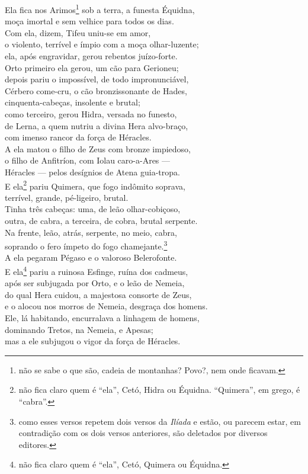 \quad{}Ela fica nos Arimos\footnote{não se sabe o que são, cadeia de montanhas? Povo?, nem onde ficavam.} sob a terra, a funesta Équidna,\\
moça imortal e sem velhice para todos os dias. \\
Com ela, dizem, Tifeu uniu-se em amor,\\
o violento, terrível e ímpio com a moça olhar-luzente;\\
ela, após engravidar, gerou rebentos juízo-forte.\\
Orto primeiro ela gerou, um cão para Gerioneu;\\
depois pariu o impossível, de todo impronunciável, \\
Cérbero come-cru, o cão bronzissonante de Hades,\\
cinquenta-cabeças, insolente e brutal;\\
como terceiro, gerou Hidra, versada no funesto,\\
de Lerna, a quem nutriu a divina Hera alvo-braço,\\
com imenso rancor da força de Héracles. \\
A ela matou o filho de Zeus com bronze impiedoso,\\
o filho de Anfitríon, com Iolau caro-a-Ares ---\\
Héracles --- pelos desígnios de Atena guia-tropa.\\
E ela\footnote{não fica claro quem é ``ela'', Cetó, Hidra ou Équidna. ``Quimera'',
em grego, é ``cabra''.} pariu Quimera, que fogo indômito soprava,\\
terrível, grande, pé-ligeiro, brutal.\\ 
Tinha três cabeças: uma, de leão olhar-cobiçoso,\\
outra, de cabra, a terceira, de cobra, brutal serpente.\\
Na frente, leão, atrás, serpente, no meio, cabra,\\
soprando o fero ímpeto do fogo chamejante.\footnote{como esses versos repetem dois versos da \emph{Ilíada} e estão,
ou parecem estar, em contradição com os dois versos anteriores, são
deletados por diversos editores.}\\
A ela pegaram Pégaso e o valoroso Belerofonte. \\
E ela\footnote{não fica claro quem é ``ela'', Cetó, Quimera ou Équidna.} pariu a ruinosa Esfinge, ruína dos cadmeus,\\
após ser subjugada por Orto, e o leão de Nemeia,\\
do qual Hera cuidou, a majestosa consorte de Zeus,\\
e o alocou nos morros de Nemeia, desgraça dos homens.\\
Ele, lá habitando, encurralava a linhagem de homens, \\
dominando Tretos, na Nemeia, e Apesas;\\
mas a ele subjugou o vigor da força de Héracles.


